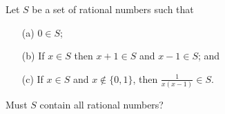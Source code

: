 Let $S$ be a set of rational numbers such that
\begin{enumerate}
\item[(a)] $0 \in S$;
\item[(b)] If $x \in S$ then $x+1\in S$ and $x-1\in S$; and
\item[(c)] If $x\in S$ and $x\not\in\{0,1\}$, then $\frac{1}{x(x-1)}\in S$.
\end{enumerate}
Must $S$ contain all rational numbers?
